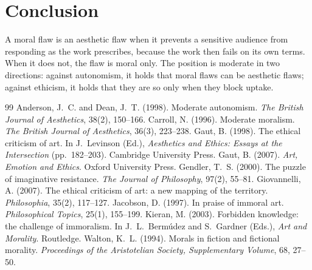 \documentclass{situationist-preprint}
\begin{document}
\section{Conclusion}

A moral flaw is an aesthetic flaw when it prevents a sensitive audience from responding as the work prescribes, because the work then fails on its own terms. When it does not, the flaw is moral only. The position is moderate in two directions: against autonomism, it holds that moral flaws can be aesthetic flaws; against ethicism, it holds that they are so only when they block uptake.

\begin{thebibliography}{99}\small
{} Anderson, J.~C. and Dean, J.~T. (1998). Moderate autonomism. \emph{The British Journal of Aesthetics}, 38(2), 150--166.
 Carroll, N. (1996). Moderate moralism. \emph{The British Journal of Aesthetics}, 36(3), 223--238.
 Gaut, B. (1998). The ethical criticism of art. In J.~Levinson (Ed.), \emph{Aesthetics and Ethics: Essays at the Intersection} (pp.~182--203). Cambridge University Press.
 Gaut, B. (2007). \emph{Art, Emotion and Ethics}. Oxford University Press.
 Gendler, T.~S. (2000). The puzzle of imaginative resistance. \emph{The Journal of Philosophy}, 97(2), 55--81.
 Giovannelli, A. (2007). The ethical criticism of art: a new mapping of the territory. \emph{Philosophia}, 35(2), 117--127.
 Jacobson, D. (1997). In praise of immoral art. \emph{Philosophical Topics}, 25(1), 155--199.
 Kieran, M. (2003). Forbidden knowledge: the challenge of immoralism. In J.~L.~Bermúdez and S.~Gardner (Eds.), \emph{Art and Morality}. Routledge.
 Walton, K.~L. (1994). Morals in fiction and fictional morality. \emph{Proceedings of the Aristotelian Society, Supplementary Volume}, 68, 27--50.
\end{thebibliography}
\end{document}
